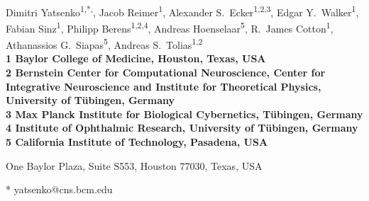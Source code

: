 \documentclass[10pt,letterpaper]{article}
\date{}
\begin{document}
\vspace*{0.35in}

\begin{flushleft}
{\Large
\textbf{}
}
\newline
\\
Dimitri Yatsenko\textsuperscript{1,*,\ddag}, 
Jacob Reimer\textsuperscript{1}, 
Alexander S.~Ecker\textsuperscript{1,2,3}, 
Edgar Y.~Walker\textsuperscript{1},
Fabian Sinz\textsuperscript{1}, 
Philipp Berens\textsuperscript{1,2,4}, 
Andreas Hoenselaar\textsuperscript{5}, 
R.~James Cotton\textsuperscript{1}, 
Athanassios G.~Siapas\textsuperscript{5}, 
Andreas S.~Tolias\textsuperscript{1,2}
\\
\bigskip
\bf{1} Baylor College of Medicine, Houston, Texas, USA
\\
\bf{2} Bernstein Center for Computational Neuroscience, Center for Integrative Neuroscience and Institute for Theoretical Physics, University of Tübingen, Germany
\\
\bf{3} Max Planck Institute for Biological Cybernetics, Tübingen, Germany
\\
\bf{4} Institute of Ophthalmic Research, University of Tübingen, Germany
\\
\bf{5} California Institute of Technology, Pasadena, USA
\\
\bigskip

% 
%


\ddag One Baylor Plaza, Suite S553, Houston 77030, Texas, USA



* yatsenko@cns.bcm.edu

\end{flushleft}
\end{document}
